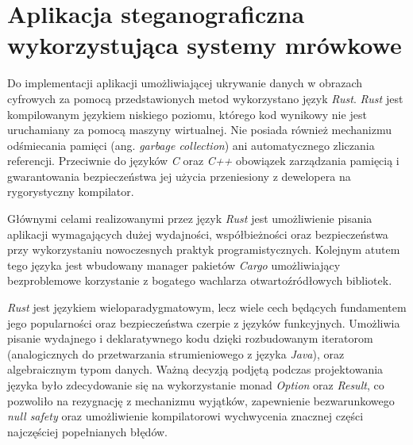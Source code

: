\chapter{Aplikacja steganograficzna wykorzystująca systemy mrówkowe}\label{chap:implementation}
{

    Do implementacji aplikacji umożliwiającej ukrywanie danych w obrazach cyfrowych za pomocą przedstawionych metod
    wykorzystano język \textit{Rust}. \textit{Rust} jest kompilowanym językiem niskiego poziomu, którego kod wynikowy
    nie jest uruchamiany za pomocą maszyny wirtualnej. Nie posiada również mechanizmu odśmiecania pamięci (ang.
    \textit{garbage collection}) ani automatycznego zliczania referencji. Przeciwnie do języków \textit{C} oraz
    \textit{C++} obowiązek zarządzania pamięcią i gwarantowania bezpieczeństwa jej użycia przeniesiony z dewelopera na
    rygorystyczny kompilator.

    Głównymi celami realizowanymi przez język \textit{Rust} jest umożliwienie pisania aplikacji wymagających dużej
    wydajności, współbieżności oraz bezpieczeństwa przy wykorzystaniu nowoczesnych praktyk programistycznych. Kolejnym
    atutem tego języka jest wbudowany manager pakietów \textit{Cargo} umożliwiający bezproblemowe korzystanie z bogatego
    wachlarza otwartoźródłowych bibliotek.

    \textit{Rust} jest językiem wieloparadygmatowym, lecz wiele cech będących fundamentem jego popularności oraz
    bezpieczeństwa czerpie z języków funkcyjnych. Umożliwia pisanie wydajnego i deklaratywnego kodu dzięki rozbudowanym
    iteratorom (analogicznych do przetwarzania strumieniowego z języka \textit{Java}), oraz algebraicznym typom danych.
    Ważną decyzją podjętą podczas projektowania języka było zdecydowanie się na wykorzystanie monad \textit{Option} oraz
    \textit{Result}, co pozwoliło na rezygnację z mechanizmu wyjątków, zapewnienie bezwarunkowego \textit{null
    safety} oraz umożliwienie kompilatorowi wychwycenia znacznej części najczęściej popełnianych błędów.

}
